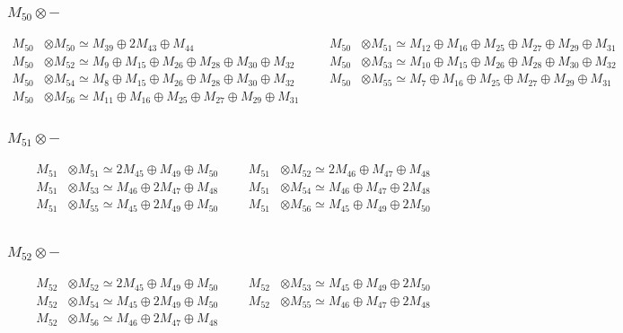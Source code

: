 \subsubsection{$ M_{50}\otimes -$}
\begin{align*}
M_{50} &\otimes M_{50} \simeq M_{39} \oplus 2M_{43} \oplus M_{44} &&& M_{50} &\otimes M_{51} \simeq M_{12} \oplus M_{16} \oplus M_{25} \oplus M_{27} \oplus M_{29} \oplus M_{31}\\
M_{50} &\otimes M_{52} \simeq M_{9} \oplus M_{15} \oplus M_{26} \oplus M_{28} \oplus M_{30} \oplus M_{32} &&& M_{50} &\otimes M_{53} \simeq M_{10} \oplus M_{15} \oplus M_{26} \oplus M_{28} \oplus M_{30} \oplus M_{32}\\
M_{50} &\otimes M_{54} \simeq M_{8} \oplus M_{15} \oplus M_{26} \oplus M_{28} \oplus M_{30} \oplus M_{32} &&& M_{50} &\otimes M_{55} \simeq M_{7} \oplus M_{16} \oplus M_{25} \oplus M_{27} \oplus M_{29} \oplus M_{31}\\
M_{50} &\otimes M_{56} \simeq M_{11} \oplus M_{16} \oplus M_{25} \oplus M_{27} \oplus M_{29} \oplus M_{31}
\end{align*}

\subsubsection{$ M_{51}\otimes -$}
\begin{align*}
M_{51} &\otimes M_{51} \simeq 2M_{45} \oplus M_{49} \oplus M_{50} &&& M_{51} &\otimes M_{52} \simeq 2M_{46} \oplus M_{47} \oplus M_{48}\\
M_{51} &\otimes M_{53} \simeq M_{46} \oplus 2M_{47} \oplus M_{48} &&& M_{51} &\otimes M_{54} \simeq M_{46} \oplus M_{47} \oplus 2M_{48}\\
M_{51} &\otimes M_{55} \simeq M_{45} \oplus 2M_{49} \oplus M_{50} &&& M_{51} &\otimes M_{56} \simeq M_{45} \oplus M_{49} \oplus 2M_{50}\\
\end{align*}

\subsubsection{$ M_{52}\otimes -$}
\begin{align*}
M_{52} &\otimes M_{52} \simeq 2M_{45} \oplus M_{49} \oplus M_{50} &&& M_{52} &\otimes M_{53} \simeq M_{45} \oplus M_{49} \oplus 2M_{50}\\
M_{52} &\otimes M_{54} \simeq M_{45} \oplus 2M_{49} \oplus M_{50} &&& M_{52} &\otimes M_{55} \simeq M_{46} \oplus M_{47} \oplus 2M_{48}\\
M_{52} &\otimes M_{56} \simeq M_{46} \oplus 2M_{47} \oplus M_{48}
\end{align*}

